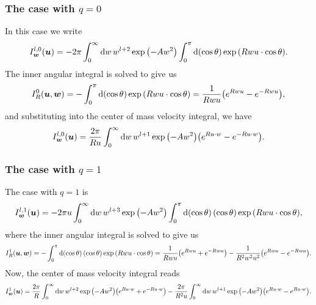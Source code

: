 \documentclass[aps,prl,preprint,groupedaddress,10pt]{revtex4-2}
\begin{document}
\subsubsection{The case with $q=0$}
In this case we write
\begin{equation}
    I_{\bw}^{l,0}(\bu)=-2\pi\int_0^{\infty}\dd{w}w^{l+2}\exp\pqty{-Aw^2}
    \int_0^{\pi}\dd{\pqty{\cos\theta}}\exp\pqty{Rwu\cdot\cos\theta}.
\end{equation}
The inner angular integral is solved to give us
\begin{equation}
    I^0_R(\bu,\bw)=-\int_0^{\pi}\dd{\pqty{\cos\theta}}\exp\pqty{Rwu\cdot\cos\theta}=
    \frac{1}{Rwu}\pqty{e^{Rwu}-e^{-Rwu}},
\end{equation}
and substituting into the center of mass velocity integral, we have
\begin{equation}
    I_{\bw}^{l,0}(\bu)=\frac{2\pi}{Ru}\int_0^{\infty}\dd{w}w^{l+1}\exp\pqty{-Aw^2}
    \pqty{e^{Ru\cdot w}-e^{-Ru\cdot w}}.
\end{equation}


\subsubsection{The case with $q=1$}
The case with $q=1$ is
\begin{equation}
    I_{\bw}^{l,1}(\bu)=-2\pi u\int_0^{\infty}\dd{w}w^{l+3}\exp\pqty{-Aw^2}
    \int_0^{\pi}\dd{\pqty{\cos\theta}}\pqty{\cos\theta}\exp\pqty{Rwu\cdot\cos\theta},
\end{equation}
where the inner angular integral is solved to give us
\begin{equation}
    I_R^{1}(\bu,\bw)=-\int_0^{\pi}\dd{\pqty{\cos\theta}}\pqty{\cos\theta}
    \exp\pqty{Rwu\cdot\cos\theta}=\frac{1}{Rwu}\pqty{e^{Rwu}+e^{-Rwu}}-
    \frac{1}{R^2w^2u^2}\pqty{e^{Rwu}-e^{-Rwu}}.
\end{equation}
Now, the center of mass velocity integral reads
\begin{equation}
    I_{\bw}^{1}(\bu)=\frac{2\pi}{R}\int_0^{\infty}\dd{w}w^{l+2}\exp\pqty{-Aw^2}
    \pqty{e^{Ru\cdot w}+e^{-Ru\cdot w}}
    -\frac{2\pi}{R^2u}\int_0^{\infty}\dd{w}w^{l+1}\exp\pqty{-Aw^2}
    \pqty{e^{Ru\cdot w}-e^{Ru\cdot w}}.
\end{equation}
\end{document}
